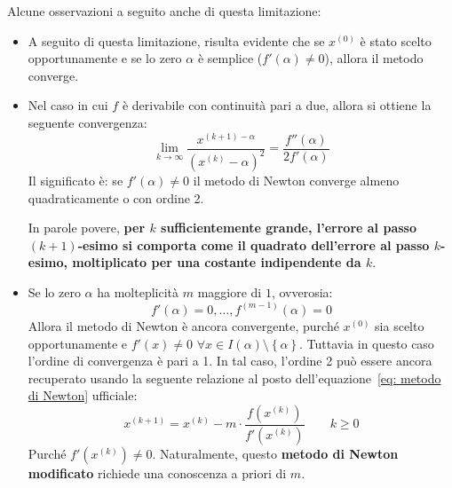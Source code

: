 \documentclass[a4paper]{article}
\newcommand{\highspace}{\vspace{1.2em}\noindent}
\begin{document}
    \highspace
    Alcune osservazioni a seguito anche di questa limitazione:
    \begin{itemize}
        \item A seguito di questa limitazione, risulta evidente che se $x^{(0)}$ è stato scelto opportunamente e se lo zero $\alpha$ è semplice ($f'\left(\alpha\right) \ne 0$), allora il metodo converge.
        
        \item Nel caso in cui $f$ è derivabile con continuità pari a due, allora si ottiene la seguente convergenza:
        \begin{equation}
            \displaystyle \lim_{k \rightarrow \infty} \dfrac{x^{\left(k+1\right) - \alpha}}{\left(x^{(k)} - \alpha\right)^{2}} = \dfrac{f''\left(\alpha\right)}{2f'\left(\alpha\right)}
        \end{equation}
        Il significato è: se $f'\left(\alpha\right) \ne 0$ il metodo di Newton converge almeno quadraticamente o con ordine 2.

        In parole povere, \textbf{per $k$ sufficientemente grande, l'errore al passo $\left(k+1\right)$-esimo si comporta come il quadrato dell'errore al passo $k$-esimo, moltiplicato per una costante indipendente da $k$}.

        \item Se lo zero $\alpha$ ha molteplicità $m$ maggiore di $1$, ovverosia:
        \begin{equation*}
            f'\left(\alpha\right) = 0, \dots, f^{\left(m-1\right)}\left(\alpha\right) = 0
        \end{equation*}
        Allora il metodo di Newton è ancora convergente, purché $x^{(0)}$ sia scelto opportunamente e $f'\left(x\right) \ne 0$ $\forall x \in I\left(\alpha\right) \setminus \left\{\alpha\right\}$. Tuttavia in questo caso l'ordine di convergenza è pari a 1. In tal caso, l'ordine 2 può essere ancora recuperato usando la seguente relazione al posto dell'equazione~\ref{eq: metodo di Newton} ufficiale:
        \begin{equation}
            x^{\left(k+1\right)} = x^{(k)} - m \cdot \dfrac{f\left(x^{(k)}\right)}{f'\left(x^{(k)}\right)} \hspace{2em} k \ge 0
        \end{equation}
        Purché $f'\left(x^{(k)}\right) \ne 0$. Naturalmente, questo \textbf{metodo di Newton modificato} richiede una conoscenza a priori di $m$.
    \end{itemize}
\end{document}
